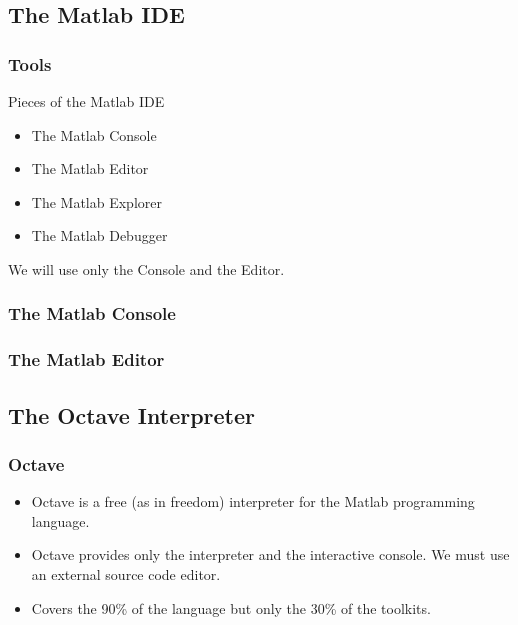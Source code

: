 \documentclass[12pt]{beamer}
\begin{document}
\subsection{The Matlab IDE}
\begin{frame}
  \frametitle{Tools}
Pieces of the Matlab IDE
\begin{itemize}
\item The Matlab Console
\item The Matlab Editor
\item The Matlab Explorer
\item The Matlab Debugger
\end{itemize}
We will use only the Console and the Editor.
\end{frame}

\begin{frame}
  \frametitle{The Matlab Console}
\end{frame}

\begin{frame}
  \frametitle{The Matlab Editor}
\end{frame}

\subsection{The Octave Interpreter}
\begin{frame}
  \frametitle{Octave}
  \begin{itemize}
  \item Octave is a free (as in freedom) interpreter for the Matlab
    programming language.
  \item Octave provides only the interpreter and the interactive
    console. We must use an external source code editor.
  \item Covers the 90\% of the language but only the 30\% of the
    toolkits.
  \end{itemize}

\end{frame}
\end{document}
